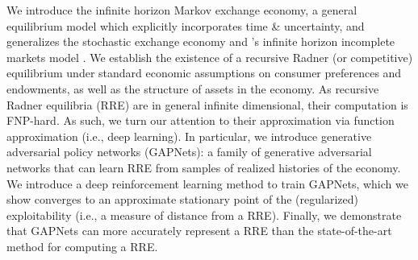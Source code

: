     We introduce the infinite horizon Markov exchange economy, a general equilibrium model which explicitly incorporates time \& uncertainty, and generalizes the \citeauthor{radner1972existence} stochastic exchange economy \cite{radner1972existence} and \citeauthor{magill1994infinite}'s infinite horizon incomplete markets model \cite{magill1994infinite}. 
    We establish the existence of a recursive Radner (or competitive) equilibrium under standard economic assumptions on consumer preferences and endowments, as well as the structure of assets in the economy. As recursive Radner equilibria (RRE) are in general infinite dimensional, their computation is FNP-hard. As such, we turn our attention to their approximation via function approximation (i.e., deep learning). In particular, we introduce generative adversarial policy networks (GAPNets): a family of generative adversarial  networks that can learn RRE from samples of realized histories of the economy. We introduce a deep reinforcement learning method to train GAPNets, which we show converges to an approximate stationary point of the (regularized) exploitability (i.e., a measure of distance from a RRE). Finally, we demonstrate that GAPNets can more accurately represent a RRE than the state-of-the-art method for computing a RRE.
\fi
